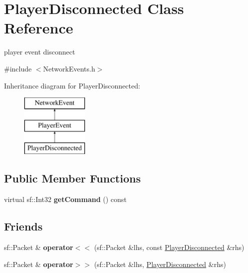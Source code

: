 \hypertarget{class_player_disconnected}{\section{Player\-Disconnected Class Reference}
\label{class_player_disconnected}
}


player event disconnect  




{\ttfamily \#include $<$Network\-Events.\-h$>$}

Inheritance diagram for Player\-Disconnected\-:\begin{figure}[H]
\begin{center}
\leavevmode
\includegraphics[height=3.000000cm]{class_player_disconnected}
\end{center}
\end{figure}
\subsection*{Public Member Functions}
\begin{DoxyCompactItemize}
\item 
\hypertarget{class_player_disconnected_a4d7130a0e3650f278d9bc260f454426d}{virtual sf\-::\-Int32 {\bfseries get\-Command} () const }\label{class_player_disconnected_a4d7130a0e3650f278d9bc260f454426d}

\end{DoxyCompactItemize}
\subsection*{Friends}
\begin{DoxyCompactItemize}
\item 
\hypertarget{class_player_disconnected_a1f69e293f5bffe2214b5d5fec9e20683}{sf\-::\-Packet \& {\bfseries operator$<$$<$} (sf\-::\-Packet \&lhs, const \hyperlink{class_player_disconnected}{Player\-Disconnected} \&rhs)}\label{class_player_disconnected_a1f69e293f5bffe2214b5d5fec9e20683}

\item 
\hypertarget{class_player_disconnected_a2891f33846a64288367070e78a114e4e}{sf\-::\-Packet \& {\bfseries operator$>$$>$} (sf\-::\-Packet \&lhs, \hyperlink{class_player_disconnected}{Player\-Disconnected} \&rhs)}\label{class_player_disconnected_a2891f33846a64288367070e78a114e4e}

\end{DoxyCompactItemize}
